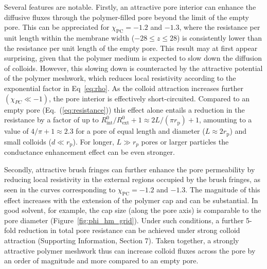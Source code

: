 \documentclass[12pt, a4paper]{article}
\begin{document}
Several features are notable. Firstly, an attractive pore interior can enhance the diffusive fluxes through the polymer-filled pore beyond the limit of the empty pore.
This can be appreciated for $\chi_{\text{PC}} = -1.2$ and $-1.3$, where the resistance per unit length within the membrane width ($-28 \leq z \leq 28$) is consistently lower than the resistance per unit length of the empty pore.
This result may at first appear surprising, given that the polymer medium is expected to slow down the diffusion of colloids.
However, this slowing down is counteracted by the attractive potential of the polymer meshwork, which reduces local resistivity according to the exponential factor in Eq~\ref{eq:rho}.
As the colloid attraction increases further $(\chi_{PC}\ll -1)$, the pore interior is effectively short-circuited.
Compared to an empty pore (Eq.~(\ref{eq:resistance})) this effect alone entails a reduction in the resistance by a factor of up to $R^0_{\text{int}}/R^0_{\text{ext}}+1 \approx 2L/(\pi r_{\text{p}})+1$, amounting to a value of $4/\pi+1 \approx 2.3$ for a pore of equal length and diameter ($L \approx 2r_{\text{p}}$) and small colloids ($d\ll r_{\text{p}}$). For longer, $L\gg r_p$ pores or larger particles the conductance enhancement  effect can be even stronger.

Secondly, attractive brush fringes can further enhance the pore permeability by reducing local resistivity in the external regions occupied by the brush fringes, as seen in the curves corresponding to $\chi_{\text{PC}} = -1.2$ and $-1.3$.
The magnitude of this effect increases with the extension of the polymer cap and can be substantial. In good solvent, for example, the cap size (along the pore axis) is comparable to the pore diameter (Figure~\ref{fig:phi_hm_grid}). Under such conditions, a further 5-fold reduction in total pore resistance can be achieved under strong colloid attraction (Supporting Information, Section 7).
Taken together, a strongly attractive polymer meshwork thus can increase colloid fluxes across the pore by an order of magnitude and more compared to an empty pore.


\end{document}
